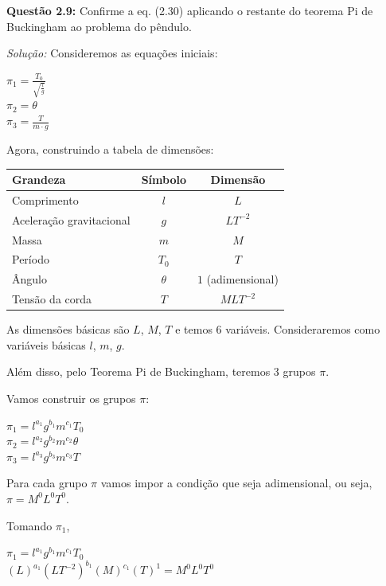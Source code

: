 \textbf{Questão 2.9:} Confirme a eq. (2.30) aplicando o restante do teorema Pi de Buckingham ao problema do pêndulo.

\vspace{0,25cm}
\textit{Solução:}
Consideremos as equações iniciais:
\begin{center}
    $\pi_{1} = \frac{T_{0}}{\sqrt{\frac{l}{g}}}$  \\
    \vspace{0,2cm}
    $\pi_{2} = \theta$ \\
     \vspace{0,2cm}
    $\pi_{3} = \frac{T}{m \cdot g}$
\end{center}

Agora, construindo a tabela de dimensões:
\begin{table}[h]
\centering
\begin{tabular}{lcc}
\toprule
\textbf{Grandeza} & \textbf{Símbolo} & \textbf{Dimensão} \\ \midrule
Comprimento & $l$ & $L$  \\
Aceleração gravitacional & $g$ & $LT^{-2}$  \\
Massa & $m$ & $M$  \\
Período & $T_0$ & $T$ \\
Ângulo & $\theta$ & $1$ (adimensional)  \\
Tensão da corda & $T$ & $MLT^{-2}$  \\ \bottomrule
\end{tabular}
\end{table}
    

As dimensões básicas são $L$, $M$, $T$ e temos 6 variáveis. Consideraremos como variáveis básicas $l$, $m$, $g$. 

Além disso, pelo Teorema Pi de Buckingham, teremos 3 grupos $\pi$.

Vamos construir os grupos $\pi$:
\begin{center}
$\pi_{1} = l^{a_1} g^{b_1} m^{c_1} T_{0}$ \\
 \vspace{0,2cm}
$\pi_{2} = l^{a_2} g^{b_2} m^{c_2} \theta$ \\
 \vspace{0,2cm}
$\pi_{3} = l^{a_3} g^{b_3} m^{c_3} T$ \\
\end{center}

Para cada grupo $\pi$ vamos impor a condição que seja adimensional, ou seja, $\pi=M^0L^0T^0$.


Tomando $\pi_{1}$, 
\begin{center}
    $\pi_{1} = l^{a_1} g^{b_1} m^{c_1} T_{0}$ \\
     \vspace{0,2cm}
     $(L)^{a_1} (LT^{-2})^{b_1} (M)^{c_1} (T)^1 = M^0 L^0 T^0$
\end{center}


